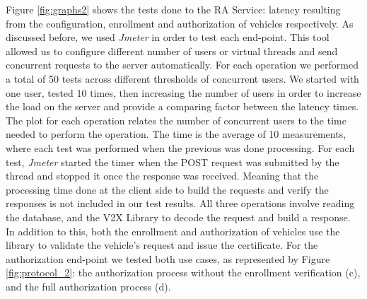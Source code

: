 	Figure \ref{fig:graphs2} shows the tests done to the RA Service: latency resulting from the configuration, enrollment and authorization of vehicles respectively. As discussed before, we used \textit{Jmeter} in order to test each end-point. This tool allowed us to configure different number of users or virtual threads and send concurrent requests to the server automatically. For each operation we performed a total of 50 tests across different thresholds of concurrent users. We started with one user, tested 10 times, then increasing the number of users in order to increase the load on the server and provide a comparing factor between the latency times. The plot for each operation relates the number of concurrent users to the time needed to perform the operation. The time is the average of 10 measurements, where each test was performed when the previous was done processing. For each test, \textit{Jmeter} started the timer when the POST request was submitted by the thread and stopped it once the response was received. Meaning that the processing time done at the client side to build the requests and verify the responses is not included in our test results. All three operations involve reading the database, and the V2X Library to decode the request and build a response. In addition to this, both the enrollment and authorization of vehicles use the library to validate the vehicle's request and issue the certificate. For the authorization end-point we tested both use cases, as represented by Figure \ref{fig:protocol_2}: the authorization process without the enrollment verification (c), and the full authorization process (d).
	
